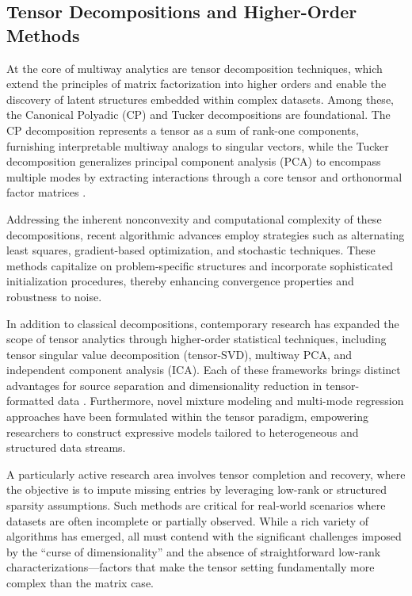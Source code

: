 \subsection{Tensor Decompositions and Higher-Order Methods}

At the core of multiway analytics are tensor decomposition techniques, which extend the principles of matrix factorization into higher orders and enable the discovery of latent structures embedded within complex datasets. Among these, the Canonical Polyadic (CP) and Tucker decompositions are foundational. The CP decomposition represents a tensor as a sum of rank-one components, furnishing interpretable multiway analogs to singular vectors, while the Tucker decomposition generalizes principal component analysis (PCA) to encompass multiple modes by extracting interactions through a core tensor and orthonormal factor matrices \cite{ref104}. 

Addressing the inherent nonconvexity and computational complexity of these decompositions, recent algorithmic advances employ strategies such as alternating least squares, gradient-based optimization, and stochastic techniques. These methods capitalize on problem-specific structures and incorporate sophisticated initialization procedures, thereby enhancing convergence properties and robustness to noise.

In addition to classical decompositions, contemporary research has expanded the scope of tensor analytics through higher-order statistical techniques, including tensor singular value decomposition (tensor-SVD), multiway PCA, and independent component analysis (ICA). Each of these frameworks brings distinct advantages for source separation and dimensionality reduction in tensor-formatted data \cite{ref104}. Furthermore, novel mixture modeling and multi-mode regression approaches have been formulated within the tensor paradigm, empowering researchers to construct expressive models tailored to heterogeneous and structured data streams.

A particularly active research area involves tensor completion and recovery, where the objective is to impute missing entries by leveraging low-rank or structured sparsity assumptions. Such methods are critical for real-world scenarios where datasets are often incomplete or partially observed. While a rich variety of algorithms has emerged, all must contend with the significant challenges imposed by the ``curse of dimensionality'' and the absence of straightforward low-rank characterizations---factors that make the tensor setting fundamentally more complex than the matrix case.

